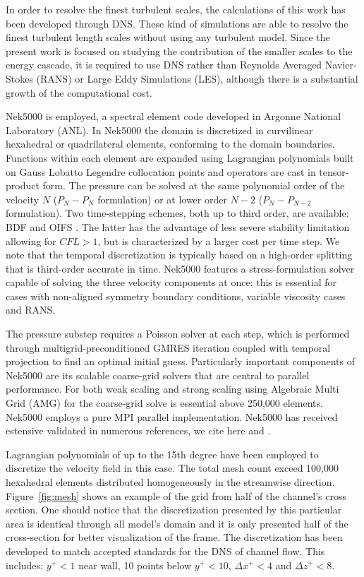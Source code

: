 \documentclass[twocolumn,10pt]{asme2e}
\begin{document}
In order to resolve the finest turbulent scales, the calculations of this work has been developed through DNS.
These kind of simulations are able to resolve the finest turbulent length scales without using any turbulent model. Since the present work is focused on studying the contribution of the smaller scales to the energy cascade, it is required to use DNS rather than Reynolds Averaged Navier-Stokes (RANS) or Large Eddy Simulations (LES), although there is a substantial growth of the computational cost.

Nek5000 is employed, a spectral element code developed in Argonne National Laboratory (ANL).  In Nek5000 \cite{fischer2015nek5000} \cite{fischer1997} the domain is discretized in curvilinear hexahedral  or quadrilateral elements, conforming to the domain boundaries. Functions within each element are expanded using Lagrangian polynomials built on Gauss Lobatto Legendre collocation points and operators are cast in tensor-product form. The pressure can be solved at the same polynomial order of the velocity $N$ ($P_{N}-P_{N}$ formulation) or at lower order $N-2$ ($P_{N}-P_{N-2}$ formulation). Two time-stepping schemes, both up to third order, are available: BDF and OIFS \cite{fischer2003implementation}. The latter has the advantage of less severe stability limitation allowing for $CFL>1$, but is characterized by a larger cost per time step. We note that the temporal discretization is typically based on a high-order splitting that is third-order accurate in time.
Nek5000 features a stress-formulation solver capable of solving the three velocity components at once: this is essential for cases with non-aligned symmetry boundary conditions, variable viscosity cases and RANS.

The pressure substep requires a Poisson solver at each step, which is performed through multigrid-preconditioned GMRES iteration coupled with temporal projection to find an optimal initial guess. Particularly important components of Nek5000 are its scalable coarse-grid solvers that are central to parallel performance. For both weak scaling and strong scaling using Algebraic Multi Grid (AMG) for the coarse-grid solve is essential above 250,000 elements. Nek5000 employs a pure MPI parallel implementation. Nek5000 has received estensive validated in numerous references, we cite here \cite{merzari2013} and \cite{Obabko2011}.

Lagrangian polynomials of up to the 15th degree have been employed to discretize the velocity field in this case. The total mesh count exceed 100,000 hexahedral elements distributed homogeneously in the streamwise direction. Figure~\ref{fig:mesh} shows an example of the grid from half of the channel's cross section. One should notice that the discretization presented by this particular area is identical through all model's domain and it is only presented half of the cross-section for better visualization of the frame. The discretization has been developed  to match accepted standards for the DNS of channel flow. This includes: $y^{+}<1$ near wall, 10 points below $y^{+}<10$, $\Delta x^{+}<4$ and $\Delta z^{+}<8$.
\end{document}
